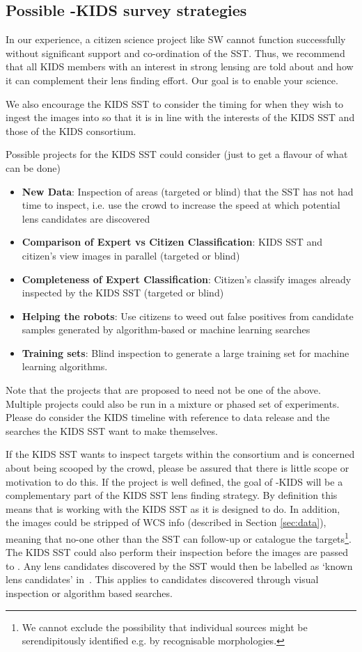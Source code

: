 \documentclass[a4paper,twocolumn]{article}
\begin{document}
\subsection{Possible \SW-KIDS survey strategies}

In our experience, a citizen science project like SW cannot function
successfully without significant support and co-ordination of the
SST. Thus, we recommend that all KIDS members with an interest in
strong lensing are told about \SW and how it can complement their lens
finding effort. Our goal is to enable your science.

We also encourage the KIDS SST to consider the timing for when they
wish to ingest the images into \SW so that it is in line with the
interests of the KIDS SST and those of the KIDS consortium.

Possible projects for the KIDS SST could consider (just to get a flavour of what can be done)
\begin{itemize}
\item \textbf{New Data}: Inspection of areas (targeted or blind) that the SST has not had time to inspect, i.e. use the crowd to increase the speed at which potential lens candidates are discovered
\item \textbf{Comparison of Expert vs Citizen Classification}: KIDS SST and citizen's view images in parallel (targeted or blind)
\item \textbf{Completeness of Expert Classification}: Citizen's classify images already inspected by the KIDS SST (targeted or blind)
\item \textbf{Helping the robots}: Use citizens to weed out false positives from candidate samples generated by algorithm-based or machine learning searches
\item \textbf{Training sets}: Blind inspection to generate a large training set for machine learning algorithms.
\end{itemize}

Note that the projects that are proposed to \SW need not be one of the
above. Multiple projects could also be  run in a mixture or phased set
of experiments. Please do consider the KIDS timeline with reference to
data release and the searches the KIDS SST want to make themselves.

If the KIDS SST wants to inspect targets within the consortium and is
concerned about being scooped by the crowd, please be assured that
there is little scope or motivation to do this. If the project is well
defined, the goal of \SW-KIDS will be a complementary part of the KIDS
SST lens finding strategy. By definition this means that \SW is
working with the KIDS SST as it is designed to do. In addition, the
images could be stripped of WCS info (described in Section
\ref{sec:data}), meaning that no-one other than the SST can follow-up
or catalogue the targets\footnote{We cannot exclude the possibility
  that individual sources might be serendipitously identified e.g. by
  recognisable morphologies.}.  The KIDS SST could also perform their
inspection before the images are passed to \SW. Any lens candidates
discovered by the SST would then be labelled as `known lens
candidates' in \sw\,\Talk. This applies to candidates discovered
through visual inspection or algorithm based searches.
\end{document}
